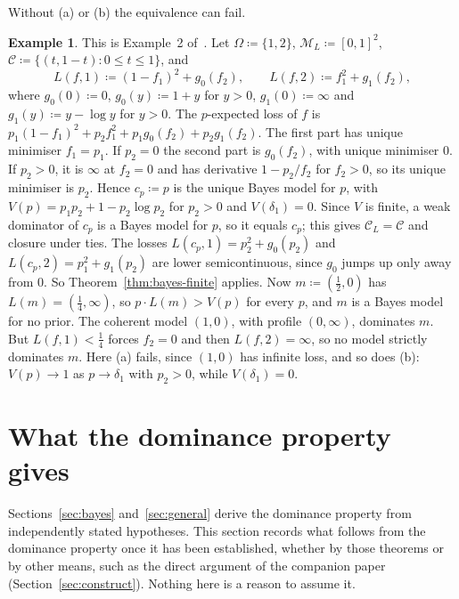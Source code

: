 \documentclass[11pt]{article}
\theoremstyle{definition}
\newtheorem{example}[theorem]{Example}
\theoremstyle{remark}
\newcommand{\M}{\mathcal M}
\newcommand{\C}{\mathcal C}
\begin{document}
Without (a) or (b) the equivalence can fail.
\begin{example}\label{ex:ssk-sharp}
This is Example~2 of~\cite{SSK09}. Let $\Omega\coloneqq\{1,2\}$, $\M_L\coloneqq[0,1]^2$, $\C\coloneqq\{(t,1-t):0\le t\le1\}$, and
\[
L(f,1)\coloneqq(1-f_1)^2+g_0(f_2),\qquad L(f,2)\coloneqq f_1^2+g_1(f_2),
\]
where $g_0(0)\coloneqq0$, $g_0(y)\coloneqq1+y$ for $y>0$, $g_1(0)\coloneqq\infty$ and $g_1(y)\coloneqq y-\log y$ for $y>0$. The $p$-expected loss of $f$ is $p_1(1-f_1)^2+p_2f_1^2+p_1g_0(f_2)+p_2g_1(f_2)$. The first part has unique minimiser $f_1=p_1$. If $p_2=0$ the second part is $g_0(f_2)$, with unique minimiser $0$. If $p_2>0$, it is $\infty$ at $f_2=0$ and has derivative $1-p_2/f_2$ for $f_2>0$, so its unique minimiser is $p_2$. Hence $c_p\coloneqq p$ is the unique Bayes model for $p$, with $V(p)=p_1p_2+1-p_2\log p_2$ for $p_2>0$ and $V(\delta_1)=0$. Since $V$ is finite, a weak dominator of $c_p$ is a Bayes model for $p$, so it equals $c_p$; this gives $\C_L=\C$ and closure under ties. The losses $L(c_p,1)=p_2^2+g_0(p_2)$ and $L(c_p,2)=p_1^2+g_1(p_2)$ are lower semicontinuous, since $g_0$ jumps up only away from $0$. So Theorem~\ref{thm:bayes-finite} applies. Now $m\coloneqq(\frac12,0)$ has $L(m)=(\frac14,\infty)$, so $p\cdot L(m)>V(p)$ for every $p$, and $m$ is a Bayes model for no prior. The coherent model $(1,0)$, with profile $(0,\infty)$, dominates $m$. But $L(f,1)<\frac14$ forces $f_2=0$ and then $L(f,2)=\infty$, so no model strictly dominates $m$. Here (a) fails, since $(1,0)$ has infinite loss, and so does (b): $V(p)\to1$ as $p\to\delta_1$ with $p_2>0$, while $V(\delta_1)=0$.
\end{example}

\section{What the dominance property gives}\label{sec:conclusion}
Sections~\ref{sec:bayes} and~\ref{sec:general} derive the dominance property from independently stated hypotheses. This section records what follows from the dominance property once it has been established, whether by those theorems or by other means, such as the direct argument of the companion paper (Section~\ref{sec:construct}). Nothing here is a reason to assume it.
\end{document}

